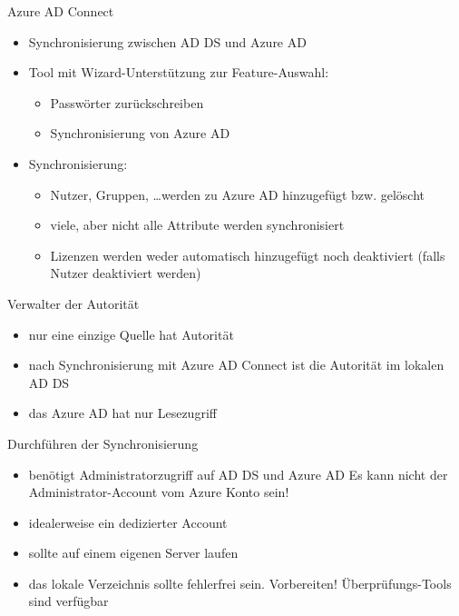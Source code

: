 \begin{flashcard}[Definition]{Azure AD Connect}
  \begin{itemize}
    \item Synchronisierung zwischen AD DS und Azure AD
    \item Tool mit Wizard-Unterstützung zur Feature-Auswahl:
    \begin{itemize}
      \item Passwörter zurückschreiben
      \item Synchronisierung von Azure AD
    \end{itemize}
    \item Synchronisierung:
    \begin{itemize}
      \item Nutzer, Gruppen, \ldots werden zu Azure AD hinzugefügt bzw. gelöscht
      \item viele, aber nicht alle Attribute werden synchronisiert
      \item Lizenzen werden weder automatisch hinzugefügt noch deaktiviert (falls Nutzer deaktiviert werden)
    \end{itemize}
  \end{itemize}
\end{flashcard}

\begin{flashcard}[Definition]{Verwalter der Autorität}
  \begin{itemize}
    \item nur eine einzige Quelle hat Autorität
    \item nach Synchronisierung mit Azure AD Connect ist die Autorität im lokalen AD DS
    \item das Azure AD hat nur Lesezugriff
  \end{itemize}
\end{flashcard}

\begin{flashcard}[Definition]{Durchführen der Synchronisierung}
  \begin{itemize}
    \item benötigt Administratorzugriff auf AD DS und Azure AD\newline
      Es kann nicht der Administrator-Account vom Azure Konto sein!
    \item idealerweise ein dedizierter Account
    \item sollte auf einem eigenen Server laufen
    \item das lokale Verzeichnis sollte fehlerfrei sein. Vorbereiten!\newline
      Überprüfungs-Tools sind verfügbar
  \end{itemize}
\end{flashcard}

